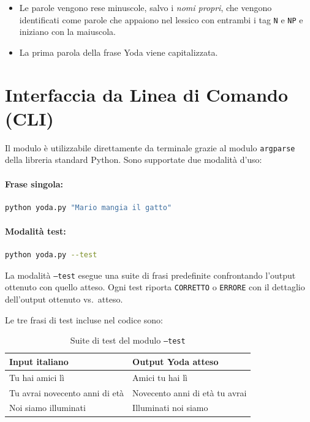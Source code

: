 \documentclass[12pt, a4paper]{article}
\begin{document}
\begin{itemize}
    \item Le parole vengono rese minuscole, salvo i \textit{nomi propri}, che
          vengono identificati come parole che appaiono nel lessico con entrambi
          i tag \texttt{N} e \texttt{NP} e iniziano con la maiuscola.
    \item La prima parola della frase Yoda viene capitalizzata.
\end{itemize}

\section{Interfaccia da Linea di Comando (CLI)}

Il modulo è utilizzabile direttamente da terminale grazie al modulo \texttt{argparse}
della libreria standard Python. Sono supportate due modalità d'uso:

\paragraph{Frase singola:}
\begin{lstlisting}[language=bash, style=pythonstyle]
python yoda.py "Mario mangia il gatto"
\end{lstlisting}

\paragraph{Modalità test:}
\begin{lstlisting}[language=bash, style=pythonstyle]
python yoda.py --test
\end{lstlisting}

La modalità \texttt{--test} esegue una suite di frasi predefinite confrontando
l'output ottenuto con quello atteso. Ogni test riporta \texttt{CORRETTO} o
\texttt{ERRORE} con il dettaglio dell'output ottenuto vs.\ atteso.

Le tre frasi di test incluse nel codice sono:

\begin{table}[H]
\centering
\caption{Suite di test del modulo \texttt{--test}}
\begin{tabular}{l l}
\toprule
\textbf{Input italiano} & \textbf{Output Yoda atteso} \\
\midrule
Tu hai amici lì & Amici tu hai lì \\
Tu avrai novecento anni di età & Novecento anni di età tu avrai \\
Noi siamo illuminati & Illuminati noi siamo \\
\bottomrule
\end{tabular}
\end{table}
\end{document}
